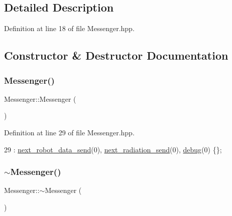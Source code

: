 \subsection{Detailed Description}


Definition at line 18 of file Messenger.\+hpp.



\subsection{Constructor \& Destructor Documentation}
\mbox{\label{class_messenger_a6e49006efdfa500349b30bdc492ba2ab}} 
\subsubsection{\texorpdfstring{Messenger()}{Messenger()}}
{\footnotesize\ttfamily Messenger\+::\+Messenger (\begin{DoxyParamCaption}{ }\end{DoxyParamCaption})\hspace{0.3cm}{\ttfamily [inline]}}



Definition at line 29 of file Messenger.\+hpp.


\begin{DoxyCode}
29 : \hyperlink{class_messenger_af47b5f9743fcef4fdb73801ae7c6b023}{next\_robot\_data\_send}(0), \hyperlink{class_messenger_a4da89e69daa6684d63fa02ff64886fe6}{next\_radiation\_send}(0), 
      \hyperlink{class_messenger_a103d1964b9540a6b6b1c4ea7d79f3af3}{debug}(0) \{\};
\end{DoxyCode}
\mbox{\label{class_messenger_a9fd6bc17fefe8105c01fc57e8abb5773}} 
\subsubsection{\texorpdfstring{$\sim$\+Messenger()}{~Messenger()}}
{\footnotesize\ttfamily Messenger\+::$\sim$\+Messenger (\begin{DoxyParamCaption}{ }\end{DoxyParamCaption})\hspace{0.3cm}{\ttfamily [inline]}}



